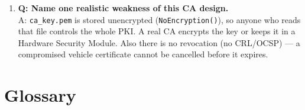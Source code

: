 \documentclass[11pt,a4paper]{article}
\begin{document}
\begin{enumerate}
        A: DER is the raw binary encoding; PEM is that binary Base64-encoded as
        text and wrapped in BEGIN/END lines so it survives copy-paste and email.
  \item \textbf{Q: Name one realistic weakness of this CA design.}\\
        A: \texttt{ca\_key.pem} is stored unencrypted (\texttt{NoEncryption()}),
        so anyone who reads that file controls the whole PKI. A real CA encrypts
        the key or keeps it in a Hardware Security Module. Also there is no
        revocation (no CRL/OCSP) --- a compromised vehicle certificate cannot be
        cancelled before it expires.
\end{enumerate}

\section{Glossary}
\end{document}
